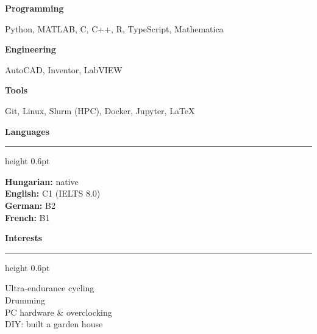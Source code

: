\documentclass[10pt,a4paper]{article}
\newlength{\sidewidth}\setlength{\sidewidth}{0.27\textwidth}
\newlength{\colgap}\setlength{\colgap}{1.3em}
\newcommand{\cvsection}[1]{%
    \vspace{0.25cm plus 1fill}%
    {\color{accent}\large\bfseries #1}\par\vspace{0.06cm}%
    {\color{accent}\hrule height 0.6pt}\vspace{0.16cm}%
}
\newcommand{\sidehead}[1]{{\bfseries #1}\par\vspace{1pt}}
\begin{document}
\begin{minipage}[t][\dimexpr\textheight-12pt\relax][s]{\sidewidth}
\vspace{0.08cm plus 0.3fill}
\sidehead{Programming}
Python, MATLAB, C, C++, R, TypeScript, Mathematica

\vspace{0.08cm plus 0.3fill}
\sidehead{Engineering}
AutoCAD, Inventor, LabVIEW

\vspace{0.08cm plus 0.3fill}
\sidehead{Tools}
Git, Linux, Slurm (HPC), Docker, Jupyter, \LaTeX

\cvsection{Languages}

\textbf{Hungarian:} native \\
\textbf{English:} C1 (IELTS 8.0) \\
\textbf{German:} B2 \\
\textbf{French:} B1

\cvsection{Interests}

Ultra-endurance cycling \\
Drumming \\
PC hardware \& overclocking \\
DIY: built a garden house

\end{minipage}%
\hspace{\colgap}%
\end{document}
